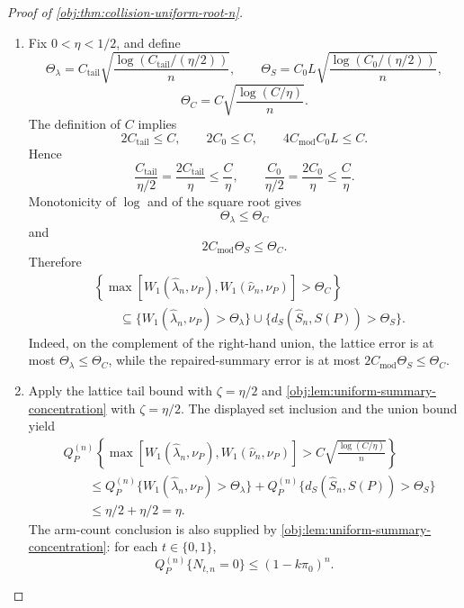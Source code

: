 \begin{proof}[Proof of \cref{obj:thm:collision-uniform-root-n}]
\begin{enumerate}
\item Fix \(0<\eta<1/2\), and define
\[
\Theta_\lambda
=
C_{\mathrm{tail}}
\sqrt{\frac{\log(C_{\mathrm{tail}}/(\eta/2))}{n}},
\qquad
\Theta_S
=
C_0L
\sqrt{\frac{\log(C_0/(\eta/2))}{n}},
\]
\[
\Theta_C
=
C\sqrt{\frac{\log(C/\eta)}{n}} .
\]
The definition of \(C\) implies
\[
2C_{\mathrm{tail}}\le C,
\qquad
2C_0\le C,
\qquad
4C_{\mathrm{mod}}C_0L\le C .
\]
Hence
\[
\frac{C_{\mathrm{tail}}}{\eta/2}
=
\frac{2C_{\mathrm{tail}}}{\eta}
\le
\frac{C}{\eta},
\qquad
\frac{C_0}{\eta/2}
=
\frac{2C_0}{\eta}
\le
\frac{C}{\eta}.
\]
Monotonicity of \(\log\) and of the square root gives
\[
\Theta_\lambda\le\Theta_C
\]
and
\[
2C_{\mathrm{mod}}\Theta_S\le\Theta_C .
\]
Therefore
\[
\begin{aligned}
&\left\{
\max\!\left[
W_1(\widehat\lambda_n,\nu_P),
W_1(\widehat\nu_n,\nu_P)
\right]>\Theta_C
\right\}  \\
&\qquad\subseteq
\{W_1(\widehat\lambda_n,\nu_P)>\Theta_\lambda\}
\cup
\{d_S(\widehat S_n,S(P))>\Theta_S\}.
\end{aligned}
\]
Indeed, on the complement of the right-hand union, the lattice error is at most
\(\Theta_\lambda\le\Theta_C\), while the repaired-summary error is at most
\(2C_{\mathrm{mod}}\Theta_S\le\Theta_C\).%

\item Apply the lattice tail bound with \(\zeta=\eta/2\) and
\cref{obj:lem:uniform-summary-concentration} with \(\zeta=\eta/2\).  The
displayed set inclusion and the union bound yield
\[
\begin{aligned}
&Q_P^{(n)}
\left\{
\max\!\left[
W_1(\widehat\lambda_n,\nu_P),
W_1(\widehat\nu_n,\nu_P)
\right]>
C\sqrt{\frac{\log(C/\eta)}{n}}
\right\} \\
&\qquad\le
Q_P^{(n)}\{W_1(\widehat\lambda_n,\nu_P)>\Theta_\lambda\}
+
Q_P^{(n)}\{d_S(\widehat S_n,S(P))>\Theta_S\} \\
&\qquad\le
\eta/2+\eta/2
=\eta .
\end{aligned}
\]
The arm-count conclusion is also supplied by
\cref{obj:lem:uniform-summary-concentration}: for each
\(t\in\{0,1\}\),
\[
Q_P^{(n)}\{N_{t,n}=0\}\le (1-k\pi_0)^n .
\]%
\end{enumerate}
\end{proof}

